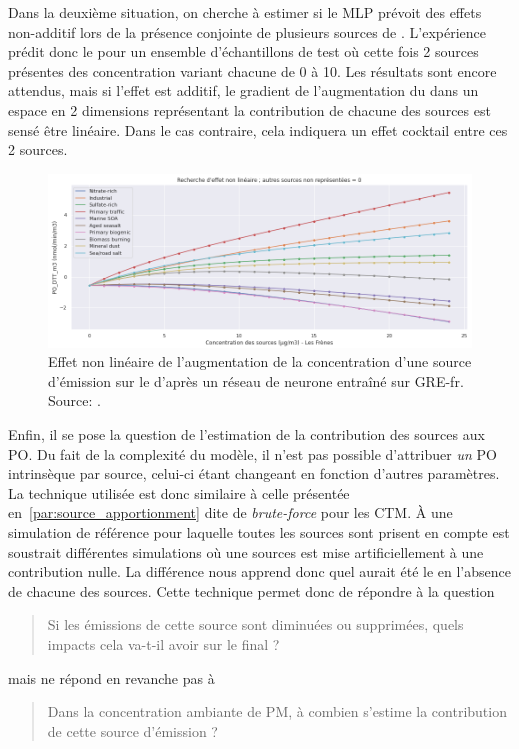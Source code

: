 Dans la deuxième situation, on cherche à estimer si le MLP prévoit des effets non-additif
lors de la présence conjointe de plusieurs sources de \PMdix. L'expérience prédit donc le
\PODTTv{} pour un ensemble d'échantillons de test où cette fois 2 sources présentes des
concentration variant chacune de 0 à \SI{10}{\ugm}. Les résultats sont encore attendus,
mais si l'effet est additif, le gradient de l'augmentation du \PODTTv{} dans un espace en
2 dimensions représentant la contribution de chacune des sources est sensé être linéaire.
Dans le cas contraire, cela indiquera un effet cocktail entre ces 2 sources.

\begin{figure}[ht]
    \centering
    \includegraphics[width=0.8\linewidth]{figures/chapter05/10sourcesLinearite.PNG}
    \caption{Effet non linéaire de l'augmentation de la concentration d'une source
        d'émission sur le \PODTTv{} d'après un réseau de neurone entraîné sur GRE-fr. Source: \cite{fichesMachine2020}.}%
    \label{fig:figures/chapter05/10sourcesLinearite}
\end{figure}

Enfin, il se pose la question de l'estimation de la contribution des sources aux PO. Du
fait de la complexité du modèle, il n'est pas possible d'attribuer \emph{un} PO
intrinsèque par source, celui-ci étant changeant en fonction d'autres paramètres.
La technique utilisée est donc similaire à celle présentée
en~\ref{par:source_apportionment} dite de \textit{brute-force} pour les CTM. À une
simulation de référence pour laquelle toutes les sources sont prisent en compte est
soustrait différentes simulations où une sources est mise artificiellement à une
contribution nulle.  La différence nous apprend donc quel aurait été le \POv{} en
l'absence de chacune des sources.
Cette technique permet donc de répondre à la question
\begin{quote}
   Si les émissions de cette source sont diminuées ou supprimées, quels impacts cela va-t-il
   avoir sur le \POv{} final ?
\end{quote}
mais ne répond en revanche pas à
\begin{quote}
   Dans la concentration ambiante de PM, à combien s'estime la contribution de cette source
   d'émission ?
\end{quote}

